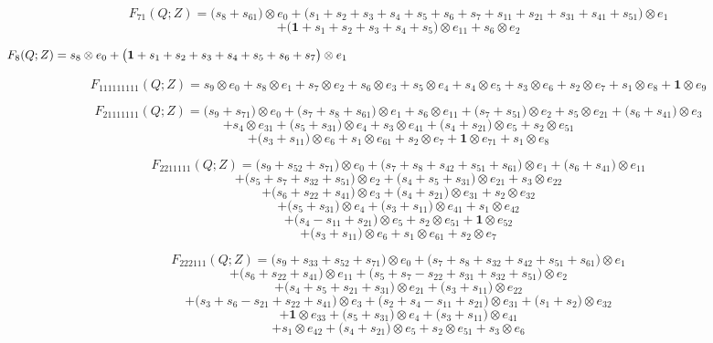 \documentclass[12pt]{amsart}
\theoremstyle{plain}
\theoremstyle{definition}
\theoremstyle{remark}
\begin{document}
$$F_{ 71 }(Q;Z)=
\big( s_{8} + s_{61} \big) \otimes e_{ 0 }
+\big( s_{1} + s_{2} + s_{3} + s_{4} + s_{5} + s_{6} + s_{7} + s_{11} + s_{21} + s_{31} + s_{41} + s_{51} \big) \otimes e_{ 1 } $$ $$
+\big( \boldsymbol{1} + s_{1} + s_{2} + s_{3} + s_{4} + s_{5} \big) \otimes e_{ 11 }
+ s_{6} \otimes e_{ 2 }
$$

$$F_{ 8 }(Q;Z)=
s_{8} \otimes e_{ 0 }
+\big( \boldsymbol{1} + s_{1} + s_{2} + s_{3} + s_{4} + s_{5} + s_{6} + s_{7} \big) \otimes e_{ 1 }
\hskip 5in \  $$

$$F_{ 111111111 }(Q;Z)=
s_{9} \otimes e_{ 0 }
+ s_{8} \otimes e_{ 1 }
+ s_{7} \otimes e_{ 2 }
+ s_{6} \otimes e_{ 3 }
+ s_{5} \otimes e_{ 4 }
+ s_{4} \otimes e_{ 5 }
+ s_{3} \otimes e_{ 6 }
+ s_{2} \otimes e_{ 7 }
+ s_{1} \otimes e_{ 8 }
+ \boldsymbol{1} \otimes e_{ 9 }
$$

$$F_{ 21111111 }(Q;Z)=
\big( s_{9} + s_{71} \big) \otimes e_{ 0 }
+\big( s_{7} + s_{8} + s_{61} \big) \otimes e_{ 1 }
+ s_{6} \otimes e_{ 11 }
+\big( s_{7} + s_{51} \big) \otimes e_{ 2 }
+ s_{5} \otimes e_{ 21 }
+\big( s_{6} + s_{41} \big) \otimes e_{ 3 } $$ $$
+ s_{4} \otimes e_{ 31 }
+\big( s_{5} + s_{31} \big) \otimes e_{ 4 }
+ s_{3} \otimes e_{ 41 }
+\big( s_{4} + s_{21} \big) \otimes e_{ 5 }
+ s_{2} \otimes e_{ 51 } $$ $$
+\big( s_{3} + s_{11} \big) \otimes e_{ 6 } 
+ s_{1} \otimes e_{ 61 }
+ s_{2} \otimes e_{ 7 }
+ \boldsymbol{1} \otimes e_{ 71 }
+ s_{1} \otimes e_{ 8 }
$$

$$F_{ 2211111 }(Q;Z)=
\big( s_{9} + s_{52} + s_{71} \big) \otimes e_{ 0 }
+\big( s_{7} + s_{8} + s_{42} + s_{51} + s_{61} \big) \otimes e_{ 1 }
+\big( s_{6} + s_{41} \big) \otimes e_{ 11 } $$ $$
+\big( s_{5} + s_{7} + s_{32} + s_{51} \big) \otimes e_{ 2 }
+\big( s_{4} + s_{5} + s_{31} \big) \otimes e_{ 21 }
+ s_{3} \otimes e_{ 22 } $$ $$
+\big( s_{6} + s_{22} + s_{41} \big) \otimes e_{ 3 }
+\big( s_{4} + s_{21} \big) \otimes e_{ 31 }
+ s_{2} \otimes e_{ 32 } $$ $$
+\big( s_{5} + s_{31} \big) \otimes e_{ 4 }
+\big( s_{3} + s_{11} \big) \otimes e_{ 41 }
+ s_{1} \otimes e_{ 42 } $$ $$
+\big( s_{4} - s_{11} + s_{21} \big) \otimes e_{ 5 }
+ s_{2} \otimes e_{ 51 }
+ \boldsymbol{1} \otimes e_{ 52 } $$ $$
+\big( s_{3} + s_{11} \big) \otimes e_{ 6 }
+ s_{1} \otimes e_{ 61 }
+ s_{2} \otimes e_{ 7 }
$$

$$F_{ 222111 }(Q;Z)=
\big( s_{9} + s_{33} + s_{52} + s_{71} \big) \otimes e_{ 0 }
+\big( s_{7} + s_{8} + s_{32} + s_{42} + s_{51} + s_{61} \big) \otimes e_{ 1 } $$ $$
+\big( s_{6} + s_{22} + s_{41} \big) \otimes e_{ 11 }
+\big( s_{5} + s_{7} - s_{22} + s_{31} + s_{32} + s_{51} \big) \otimes e_{ 2 } $$ $$
+\big( s_{4} + s_{5} + s_{21} + s_{31} \big) \otimes e_{ 21 }
+\big( s_{3} + s_{11} \big) \otimes e_{ 22 } $$ $$
+\big( s_{3} + s_{6} - s_{21} + s_{22} + s_{41} \big) \otimes e_{ 3 }
+\big( s_{2} + s_{4} - s_{11} + s_{21} \big) \otimes e_{ 31 }
+\big( s_{1} + s_{2} \big) \otimes e_{ 32 }$$ $$
+ \boldsymbol{1} \otimes e_{ 33 }
+\big( s_{5} + s_{31} \big) \otimes e_{ 4 }
+\big( s_{3} + s_{11} \big) \otimes e_{ 41 } $$ $$
+ s_{1} \otimes e_{ 42 }
+\big( s_{4} + s_{21} \big) \otimes e_{ 5 }
+ s_{2} \otimes e_{ 51 }
+ s_{3} \otimes e_{ 6 }
$$
\end{document}

